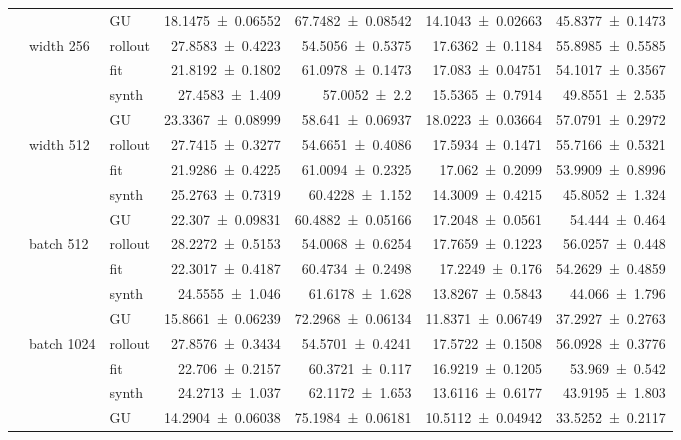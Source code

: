 {\begin{longtable}{@{}lllrrrr@{}}
     &  & GU & \num{18.1475+-0.06552} & \num{67.7482+-0.08542} & \num{14.1043+-0.02663} & \num{45.8377+-0.1473} \\
    \addlinespace[2pt]
     & width 256 & rollout & \num{27.8583+-0.4223} & \num{54.5056+-0.5375} & \num{17.6362+-0.1184} & \num{55.8985+-0.5585} \\
     &  & fit & \num{21.8192+-0.1802} & \num{61.0978+-0.1473} & \num{17.083+-0.04751} & \num{54.1017+-0.3567} \\
     &  & synth & \num{27.4583+-1.409} & \num{57.0052+-2.2} & \num{15.5365+-0.7914} & \num{49.8551+-2.535} \\
     &  & GU & \num{23.3367+-0.08999} & \num{58.641+-0.06937} & \num{18.0223+-0.03664} & \num{57.0791+-0.2972} \\
    \addlinespace[2pt]
     & width 512 & rollout & \num{27.7415+-0.3277} & \num{54.6651+-0.4086} & \num{17.5934+-0.1471} & \num{55.7166+-0.5321} \\
     &  & fit & \num{21.9286+-0.4225} & \num{61.0094+-0.2325} & \num{17.062+-0.2099} & \num{53.9909+-0.8996} \\
     &  & synth & \num{25.2763+-0.7319} & \num{60.4228+-1.152} & \num{14.3009+-0.4215} & \num{45.8052+-1.324} \\
     &  & GU & \num{22.307+-0.09831} & \num{60.4882+-0.05166} & \num{17.2048+-0.0561} & \num{54.444+-0.464} \\
    \addlinespace[2pt]
     & batch 512 & rollout & \num{28.2272+-0.5153} & \num{54.0068+-0.6254} & \num{17.7659+-0.1223} & \num{56.0257+-0.448} \\
     &  & fit & \num{22.3017+-0.4187} & \num{60.4734+-0.2498} & \num{17.2249+-0.176} & \num{54.2629+-0.4859} \\
     &  & synth & \num{24.5555+-1.046} & \num{61.6178+-1.628} & \num{13.8267+-0.5843} & \num{44.066+-1.796} \\
     &  & GU & \num{15.8661+-0.06239} & \num{72.2968+-0.06134} & \num{11.8371+-0.06749} & \num{37.2927+-0.2763} \\
    \addlinespace[2pt]
     & batch 1024 & rollout & \num{27.8576+-0.3434} & \num{54.5701+-0.4241} & \num{17.5722+-0.1508} & \num{56.0928+-0.3776} \\
     &  & fit & \num{22.706+-0.2157} & \num{60.3721+-0.117} & \num{16.9219+-0.1205} & \num{53.969+-0.542} \\
     &  & synth & \num{24.2713+-1.037} & \num{62.1172+-1.653} & \num{13.6116+-0.6177} & \num{43.9195+-1.803} \\
     &  & GU & \num{14.2904+-0.06038} & \num{75.1984+-0.06181} & \num{10.5112+-0.04942} & \num{33.5252+-0.2117} \\

\end{longtable}}
